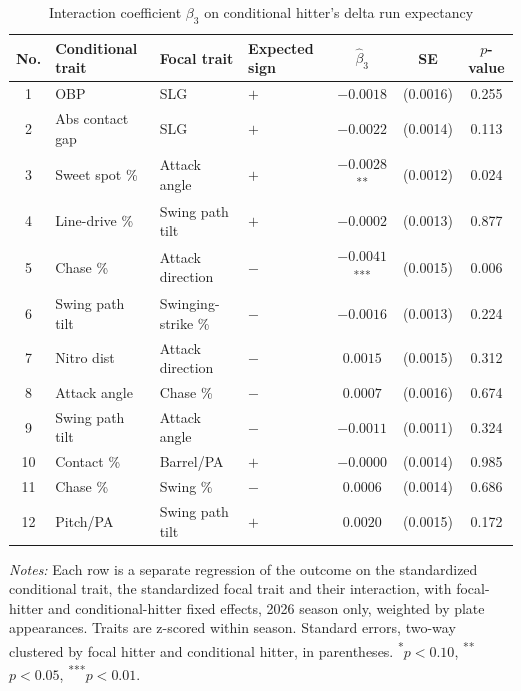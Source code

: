 \begin{table}[htbp]
\centering
\small
\caption{Interaction coefficient $\beta_3$ on conditional hitter's delta run expectancy}
\label{tab:table1_cond_2026}
\begin{tabular}{clllccc}
\toprule
No. & Conditional trait & Focal trait & Expected sign & $\hat\beta_3$ & SE & $p$-value \\
\midrule
1 & OBP & SLG & $+$ & $-0.0018$ & (0.0016) & 0.255 \\
2 & Abs contact gap & SLG & $+$ & $-0.0022$ & (0.0014) & 0.113 \\
3 & Sweet spot \% & Attack angle & $+$ & $-0.0028$\textsuperscript{**} & (0.0012) & 0.024 \\
4 & Line-drive \% & Swing path tilt & $+$ & $-0.0002$ & (0.0013) & 0.877 \\
5 & Chase \% & Attack direction & $-$ & $-0.0041$\textsuperscript{***} & (0.0015) & 0.006 \\
6 & Swing path tilt & Swinging-strike \% & $-$ & $-0.0016$ & (0.0013) & 0.224 \\
7 & Nitro dist & Attack direction & $-$ & $0.0015$ & (0.0015) & 0.312 \\
8 & Attack angle & Chase \% & $-$ & $0.0007$ & (0.0016) & 0.674 \\
9 & Swing path tilt & Attack angle & $-$ & $-0.0011$ & (0.0011) & 0.324 \\
10 & Contact \% & Barrel/PA & $+$ & $-0.0000$ & (0.0014) & 0.985 \\
11 & Chase \% & Swing \% & $-$ & $0.0006$ & (0.0014) & 0.686 \\
12 & Pitch/PA & Swing path tilt & $+$ & $0.0020$ & (0.0015) & 0.172 \\
\bottomrule
\end{tabular}
\par\smallskip\parbox{0.95\textwidth}{\footnotesize \textit{Notes:} Each row is a separate regression of the outcome on the standardized conditional trait, the standardized focal trait and their interaction, with focal-hitter and conditional-hitter fixed effects, 2026 season only, weighted by plate appearances. Traits are z-scored within season. Standard errors, two-way clustered by focal hitter and conditional hitter, in parentheses. \textsuperscript{*}$p<0.10$, \textsuperscript{**}$p<0.05$, \textsuperscript{***}$p<0.01$.}
\end{table}

